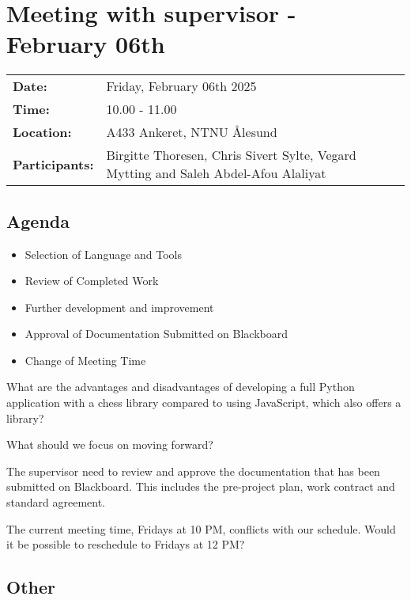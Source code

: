 \section{Meeting with supervisor - February 06th}
\begin{tabular}{ll}
    \textbf{Date:} & Friday, February 06th 2025 \\
    \textbf{Time:} & 10.00 - 11.00\\
    \textbf{Location:} & A433 Ankeret, NTNU Ålesund \\
    \textbf{Participants:} & Birgitte Thoresen, Chris Sivert Sylte, Vegard Mytting and Saleh Abdel-Afou Alaliyat\\
\end{tabular}

\vspace{0.5cm}

\subsection{Agenda}

\begin{itemize}
    \item Selection of Language and Tools
    \item Review of Completed Work
    \item Further development and improvement
    \item Approval of Documentation Submitted on Blackboard
    \item Change of Meeting Time
\end{itemize}

What are the advantages and disadvantages of developing a full Python application with a chess library compared to using JavaScript, which also offers a library?

What should we focus on moving forward?

The supervisor need to review and approve the documentation that has been submitted on Blackboard. This includes the pre-project plan, work contract and standard agreement.  

The current meeting time, Fridays at 10 PM, conflicts with our schedule. Would it be possible to reschedule to Fridays at 12 PM?

\subsection{Other}
